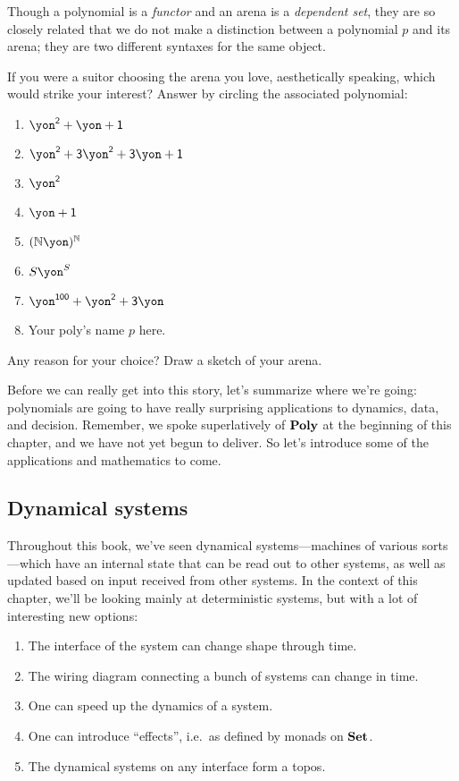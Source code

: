 \documentclass[DynamicalBook]{subfiles}
\begin{document}
\begin{remark}
Though a polynomial is a \emph{functor} and an arena is a \emph{dependent set},
they are so closely related that we do not make a distinction between a
polynomial $p$ and its arena; they are two different syntaxes for the same object. 
\end{remark}

\begin{exercise}
If you were a suitor choosing the arena you love, aesthetically speaking, which would strike your interest? Answer by circling the associated polynomial:
\begin{enumerate}
	\item $\yon^\2+\yon+\1$
	\item $\yon^\2+\3\yon^\2+\3\yon+\1$
	\item $\yon^\2$
	\item $\yon+\1$
	\item $(\nn\yon)^\nn$
	\item $S\yon^S$
	\item $\yon^{\1\0\0}+\yon^\2+\3\yon$
	\item Your poly's name $p$ here.
\end{enumerate}
Any reason for your choice? Draw a sketch of your arena.
\end{exercise}

Before we can really get into this story, let's summarize where we're going: polynomials are going to have really surprising applications to dynamics, data, and decision. Remember, we spoke superlatively of $\textbf{Poly}$ at the beginning of this chapter,
and we have not yet begun to deliver. So let's introduce some of the applications and mathematics to come.

\subsection{Dynamical systems}

Throughout this book, we've seen dynamical systems---machines of various sorts---which have an internal state that can be read out to other systems, as well as updated based on input received from other systems. In the context of this chapter, we'll be looking mainly at deterministic systems, but with a lot of interesting new options:
\begin{enumerate}
	\item The interface of the system can change shape through time.
	\item The wiring diagram connecting a bunch of systems can change in time.
	\item One can speed up the dynamics of a system.
	\item One can introduce ``effects'', i.e.\ as defined by monads on $\textbf{Set}$.
	\item The dynamical systems on any interface form a topos.
\end{enumerate}
\end{document}

